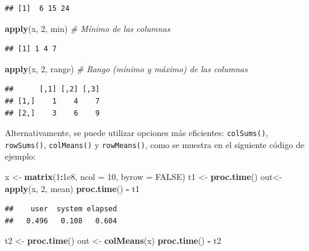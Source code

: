 \documentclass[
]{book}
\newenvironment{Shaded}{\begin{snugshade}}{\end{snugshade}}
\newcommand{\AttributeTok}[1]{\textcolor[rgb]{0.13,0.29,0.53}{#1}}
\newcommand{\CommentTok}[1]{\textcolor[rgb]{0.56,0.35,0.01}{\textit{#1}}}
\newcommand{\ConstantTok}[1]{\textcolor[rgb]{0.56,0.35,0.01}{#1}}
\newcommand{\DecValTok}[1]{\textcolor[rgb]{0.00,0.00,0.81}{#1}}
\newcommand{\FloatTok}[1]{\textcolor[rgb]{0.00,0.00,0.81}{#1}}
\newcommand{\FunctionTok}[1]{\textcolor[rgb]{0.13,0.29,0.53}{\textbf{#1}}}
\newcommand{\NormalTok}[1]{#1}
\newcommand{\OtherTok}[1]{\textcolor[rgb]{0.56,0.35,0.01}{#1}}
\newcommand{\SpecialCharTok}[1]{\textcolor[rgb]{0.81,0.36,0.00}{\textbf{#1}}}
\begin{document}
\begin{verbatim}
## [1]  6 15 24
\end{verbatim}

\begin{Shaded}
\begin{Highlighting}[]
\FunctionTok{apply}\NormalTok{(x, }\DecValTok{2}\NormalTok{, min)    }\CommentTok{\# Mínimo de las columnas}
\end{Highlighting}
\end{Shaded}

\begin{verbatim}
## [1] 1 4 7
\end{verbatim}

\begin{Shaded}
\begin{Highlighting}[]
\FunctionTok{apply}\NormalTok{(x, }\DecValTok{2}\NormalTok{, range)  }\CommentTok{\# Rango (mínimo y máximo) de las columnas}
\end{Highlighting}
\end{Shaded}

\begin{verbatim}
##      [,1] [,2] [,3]
## [1,]    1    4    7
## [2,]    3    6    9
\end{verbatim}

Alternativamente, se puede utilizar opciones más eficientes: \texttt{colSums()}, \texttt{rowSums()}, \texttt{colMeans()} y \texttt{rowMeans()}, como se muestra en el siguiente código de ejemplo:

\begin{Shaded}
\begin{Highlighting}[]
\NormalTok{x }\OtherTok{\textless{}{-}} \FunctionTok{matrix}\NormalTok{(}\DecValTok{1}\SpecialCharTok{:}\FloatTok{1e8}\NormalTok{, }\AttributeTok{ncol =} \DecValTok{10}\NormalTok{, }\AttributeTok{byrow =} \ConstantTok{FALSE}\NormalTok{)}
\NormalTok{t1 }\OtherTok{\textless{}{-}} \FunctionTok{proc.time}\NormalTok{()}
\NormalTok{out}\OtherTok{\textless{}{-}}\FunctionTok{apply}\NormalTok{(x, }\DecValTok{2}\NormalTok{, mean)   }
\FunctionTok{proc.time}\NormalTok{() }\SpecialCharTok{{-}}\NormalTok{ t1}
\end{Highlighting}
\end{Shaded}

\begin{verbatim}
##    user  system elapsed 
##   0.496   0.108   0.604
\end{verbatim}

\begin{Shaded}
\begin{Highlighting}[]
\NormalTok{t2 }\OtherTok{\textless{}{-}} \FunctionTok{proc.time}\NormalTok{()}
\NormalTok{out }\OtherTok{\textless{}{-}} \FunctionTok{colMeans}\NormalTok{(x)}
\FunctionTok{proc.time}\NormalTok{() }\SpecialCharTok{{-}}\NormalTok{ t2}
\end{Highlighting}
\end{Shaded}
\end{document}
